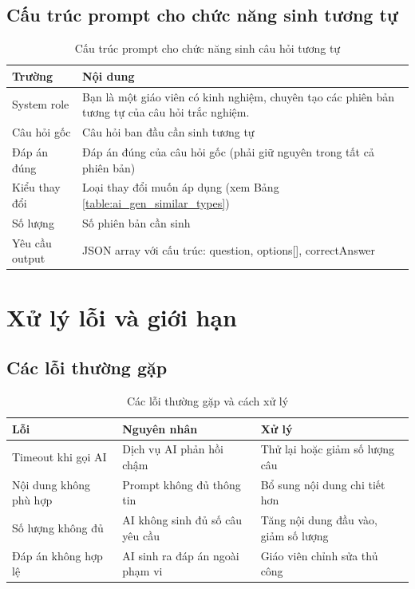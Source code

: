 ﻿\documentclass[../DoAn.tex]{subfiles}
\begin{document}
\subsection{Cấu trúc prompt cho chức năng sinh tương tự}
\begin{table}[H]
\centering
\begin{tabular}{|p{3cm}|p{10cm}|}
\hline
\textbf{Trường} & \textbf{Nội dung} \\ \hline
System role & Bạn là một giáo viên có kinh nghiệm, chuyên tạo các phiên bản tương tự của câu hỏi trắc nghiệm. \\ \hline
Câu hỏi gốc & Câu hỏi ban đầu cần sinh tương tự \\ \hline
Đáp án đúng & Đáp án đúng của câu hỏi gốc (phải giữ nguyên trong tất cả phiên bản) \\ \hline
Kiểu thay đổi & Loại thay đổi muốn áp dụng (xem Bảng \ref{table:ai_gen_similar_types}) \\ \hline
Số lượng & Số phiên bản cần sinh \\ \hline
Yêu cầu output & JSON array với cấu trúc: question, options[], correctAnswer \\ \hline
\end{tabular}
\caption{Cấu trúc prompt cho chức năng sinh câu hỏi tương tự}
\label{table:ai_gen_similar_prompt}
\end{table}

\section{Xử lý lỗi và giới hạn}

\subsection{Các lỗi thường gặp}
\begin{table}[H]
\centering
\begin{tabular}{|p{4cm}|p{5cm}|p{4cm}|}
\hline
\textbf{Lỗi} & \textbf{Nguyên nhân} & \textbf{Xử lý} \\ \hline
Timeout khi gọi AI & Dịch vụ AI phản hồi chậm & Thử lại hoặc giảm số lượng câu \\ \hline
Nội dung không phù hợp & Prompt không đủ thông tin & Bổ sung nội dung chi tiết hơn \\ \hline
Số lượng không đủ & AI không sinh đủ số câu yêu cầu & Tăng nội dung đầu vào, giảm số lượng \\ \hline
Đáp án không hợp lệ & AI sinh ra đáp án ngoài phạm vi & Giáo viên chỉnh sửa thủ công \\ \hline
\end{tabular}
\caption{Các lỗi thường gặp và cách xử lý}
\label{table:ai_gen_errors}
\end{table}
\end{document}
